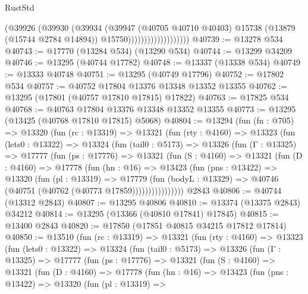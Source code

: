 \begin{lexlean}{RustStd}
\begin{coremodule}
                                  (@39926
                                    (@39930
                                      (@39934
                                        (@39947
                                          (@40705 @40710 @40403)
                                          @15738
                                          (@13879 (@15744 @2784 @14894))
                                          @15750)))))))))))))))))))
@40739 := @13278 @534
@40743 := @17770 (@13284 @534) (@13290 @534)
@40744 := @13299 @34209
@40746 := @13295 (@40744 @17782)
@40748 := @13337 (@13338 @534)
@40749 := @13333 @40748
@40751 := @13295 (@40749 @17796)
@40752 := @17802 @534
@40757 := @40752 @17804 @13376 @13348 @13352 @13355
@40762 := @13295 (@17801 (@40757 @17810 @17815) @17822)
@40763 := @17825 @534
@40768 := @40763 @17804 @13376 @13348 @13352 @13355
@40773 := @13295 (@13425 (@40768 @17810 @17815) @5068)
@40804 := @13294
    (fun (fn : @705) =>
    @13320
      (fun (rc : @13319) =>
      @13321
        (fun (rty : @4160) =>
        @13323
          (fun (lets0 : @13322) =>
          @13324
            (fun (tail0 : @5173) =>
            @13326
              (fun (Γ : @13325) =>
              @17777
                (fun (ps : @17776) =>
                @13321
                  (fun (S : @4160) =>
                  @13321
                    (fun (D : @4160) =>
                    @17778
                      (fun (hn : @16) =>
                      @13423
                        (fun (pns : @13422) =>
                        @13320
                          (fun (pl : @13319) =>
                          @17779
                            (fun (bodyL : @13329) =>
                            @40746 (@40751 (@40762 (@40773 @17859))))))))))))))))
    @2843
@40806 := @40744 (@13312 @2843)
@40807 := @13295 @40806
@40810 := @13374 (@13375 @2843) @34212
@40814 := @13295 (@13366 (@40810 @17841) @17845)
@40815 := @13400 @2843
@40820 := @17850 (@17851 @40815 @34215 @17812 @17814)
@40850 := @13510
    (fun (rc : @13319) =>
    @13321
      (fun (rty : @4160) =>
      @13323
        (fun (lets0 : @13322) =>
        @13324
          (fun (tail0 : @5173) =>
          @13326
            (fun (Γ : @13325) =>
            @17777
              (fun (ps : @17776) =>
              @13321
                (fun (S : @4160) =>
                @13321
                  (fun (D : @4160) =>
                  @17778
                    (fun (hn : @16) =>
                    @13423
                      (fun (pns : @13422) =>
                      @13320
                        (fun (pl : @13319) =>

\end{coremodule}
\end{lexlean}
